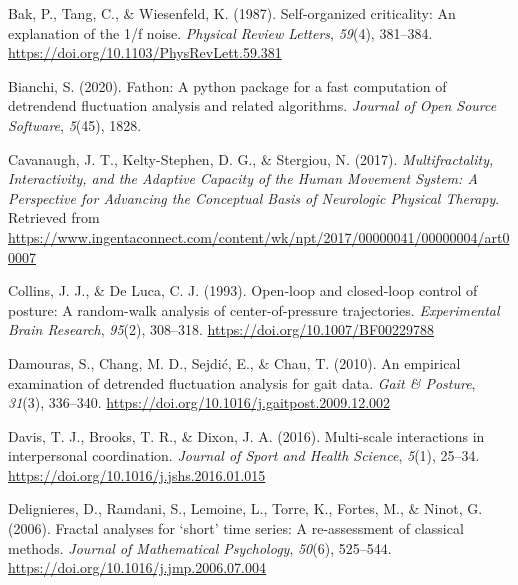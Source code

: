 \documentclass[
  man]{apa6}
\newlength{\cslhangindent}
\newlength{\cslentryspacingunit} %
\newenvironment{CSLReferences}[2] %
 {%
  \setlength{\parindent}{0pt}
  \ifodd #1
  \let\oldpar\par
  \def\par{\hangindent=\cslhangindent\oldpar}
  \fi
  \setlength{\parskip}{#2\cslentryspacingunit}
 }%
 {}
\begin{document}
\begingroup
\setlength{\parindent}{-0.5in}
\setlength{\leftskip}{0.5in}

\hypertarget{refs}{}
\begin{CSLReferences}{1}{0}
\leavevmode{}%
Bak, P., Tang, C., \& Wiesenfeld, K. (1987). Self-organized criticality: {An} explanation of the 1/f noise. \emph{Physical Review Letters}, \emph{59}(4), 381--384. \url{https://doi.org/10.1103/PhysRevLett.59.381}

\leavevmode{}%
Bianchi, S. (2020). Fathon: A python package for a fast computation of detrendend fluctuation analysis and related algorithms. \emph{Journal of Open Source Software}, \emph{5}(45), 1828.

\leavevmode{}%
Cavanaugh, J. T., Kelty-Stephen, D. G., \& Stergiou, N. (2017). \emph{Multifractality, Interactivity, and the Adaptive Capacity of the Human Movement System: A Perspective for Advancing the Conceptual Basis of Neurologic Physical Therapy}. Retrieved from \url{https://www.ingentaconnect.com/content/wk/npt/2017/00000041/00000004/art00007}

\leavevmode{}%
Collins, J. J., \& De Luca, C. J. (1993). Open-loop and closed-loop control of posture: A random-walk analysis of center-of-pressure trajectories. \emph{Experimental Brain Research}, \emph{95}(2), 308--318. \url{https://doi.org/10.1007/BF00229788}

\leavevmode{}%
Damouras, S., Chang, M. D., Sejdić, E., \& Chau, T. (2010). An empirical examination of detrended fluctuation analysis for gait data. \emph{Gait \& Posture}, \emph{31}(3), 336--340. \url{https://doi.org/10.1016/j.gaitpost.2009.12.002}

\leavevmode{}%
Davis, T. J., Brooks, T. R., \& Dixon, J. A. (2016). Multi-scale interactions in interpersonal coordination. \emph{Journal of Sport and Health Science}, \emph{5}(1), 25--34. \url{https://doi.org/10.1016/j.jshs.2016.01.015}

\leavevmode{}%
Delignieres, D., Ramdani, S., Lemoine, L., Torre, K., Fortes, M., \& Ninot, G. (2006). Fractal analyses for {`}short{'} time series: A re-assessment of classical methods. \emph{Journal of Mathematical Psychology}, \emph{50}(6), 525--544. \url{https://doi.org/10.1016/j.jmp.2006.07.004}


\end{CSLReferences}
\end{document}
